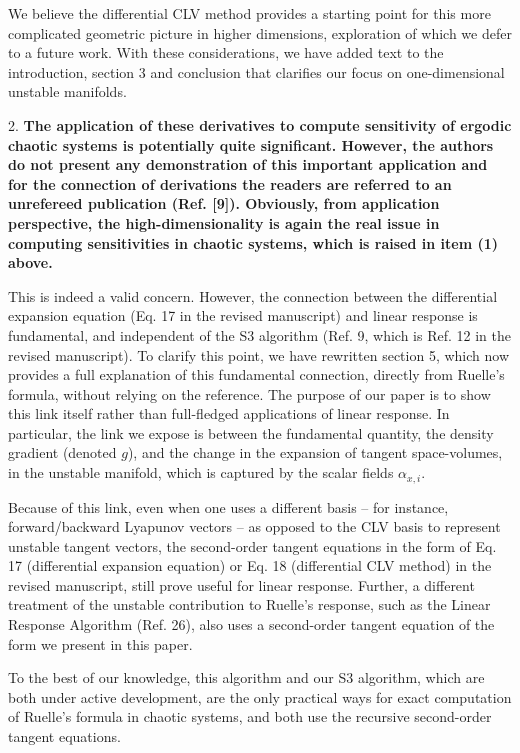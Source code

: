 \documentclass[11pt]{article}
\newcommand{\highlight}[1]{{\color{burgundy}\textbf{#1}}}
\begin{document}
We believe the differential CLV method provides a starting point for this more complicated geometric picture in higher dimensions, exploration of which we defer to a future work. With these considerations, we have added text 
to the introduction, section 3 and conclusion that clarifies our focus on one-dimensional unstable manifolds. 

2. \highlight{The application of these derivatives to compute sensitivity of ergodic chaotic systems
is potentially quite significant. 
However, the authors do not present any demonstration of 
this important application and for the connection of derivations the readers
are referred to an unrefereed publication (Ref. [9]). Obviously, from application perspective, the high-dimensionality is again the real issue in computing sensitivities
in chaotic systems, which is raised in item (1) above.}

This is indeed a valid concern. However, the connection between the differential expansion equation (Eq. 17 in the revised manuscript) and linear response is fundamental, and independent of the S3 algorithm (Ref. 9, which is Ref. 12 in the revised manuscript). To clarify this point, we have rewritten section 5, which now provides a full explanation of this fundamental connection, directly from Ruelle's formula, without relying on the reference. The purpose of our paper is to show this link itself rather than full-fledged applications of linear response. In particular, the link we expose is between the fundamental quantity, the density gradient (denoted $g$), and the change in the expansion of tangent space-volumes, in the unstable manifold, which is captured by the scalar fields $\alpha_{x,i}.$ 

Because of this link, even when one uses a different basis -- for instance, forward/backward Lyapunov vectors -- as opposed to the CLV basis to represent unstable tangent vectors, the second-order tangent equations in the form of Eq. 17 (differential expansion equation) or Eq. 18 (differential CLV method) in the revised manuscript, still prove useful for linear response. Further, a different treatment of the unstable contribution to Ruelle's response, such as the Linear Response Algorithm (Ref. 26), also uses a second-order tangent equation of the form we present in this paper.

To the best of our knowledge, this algorithm and our S3 algorithm, which are both under active development, are the only 
practical ways for exact computation of Ruelle's formula in chaotic systems, and both use the recursive second-order tangent equations. 
\end{document}
